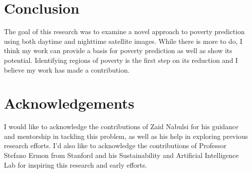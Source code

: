 \documentclass{article}
\begin{document}
\section{Conclusion}
The goal of this research was to examine a novel approach to poverty prediction using both daytime and nighttime satellite images. While there is more to do, I think my work can provide a basis for poverty prediction as well as show its potential. Identifying regions of poverty is the first step on its reduction and I believe my work has made a contribution.

\section{Acknowledgements}
I would like to acknowledge the contributions of Zaid Nabulsi for his guidance and mentorship in tackling this problem, as well as his help in exploring previous research efforts. I’d also like to acknowledge the contributions of Professor Stefano Ermon from Stanford and his Sustainability and Artificial Intelligence Lab for inspiring this research and early efforts.












{\small


}
\end{document}
